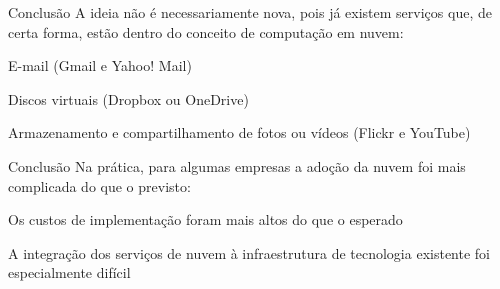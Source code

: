 \begin{frame}{Conclusão}
    A ideia não é necessariamente nova, pois já existem serviços que, de certa
        forma, estão dentro do conceito de computação em nuvem:
    \begin{itemise}
        \item<2-> E-mail (Gmail e Yahoo! Mail)
        \item<3-> Discos virtuais (Dropbox ou OneDrive)
        \item<4-> Armazenamento e compartilhamento de fotos ou vídeos (Flickr e
            YouTube)
    \end{itemise}
\end{frame}

\begin{frame}{Conclusão}
    Na prática, para algumas empresas a adoção da nuvem foi mais complicada do que o
        previsto:
    \begin{itemise}
        \item<2-> Os custos de implementação foram mais altos do que o esperado
        \item<3-> A integração dos serviços de nuvem à infraestrutura de tecnologia
            existente foi especialmente difícil
    \end{itemise}
\end{frame}

